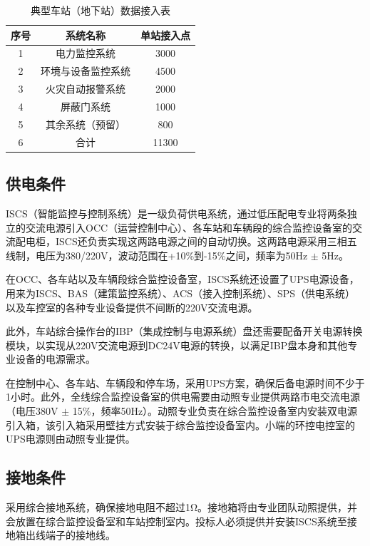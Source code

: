 \begin{table}[h]
	\centering
	\caption{典型车站（地下站）数据接入表}
	\label{tab:典型车站（地下站）数据接入表}
	
	\begin{tabular}{|c|c|c|}
		\hline
		序号 & 系统名称      & 单站接入点 \\ \hline
		1  & 电力监控系统    & 3000  \\ \hline
		2  & 环境与设备监控系统 & 4500  \\ \hline
		3  & 火灾自动报警系统  & 2000  \\ \hline
		4  & 屏蔽门系统     & 1000  \\ \hline
		5  & 其余系统（预留）  & 800   \\ \hline
		6  & 合计        & 11300 \\ \hline
	\end{tabular}%
\end{table}

\subsection{供电条件}
ISCS（智能监控与控制系统）是一级负荷供电系统，通过低压配电专业将两条独立的交流电源引入OCC（运营控制中心）、各车站和车辆段的综合监控设备室的交流配电柜，ISCS还负责实现这两路电源之间的自动切换。这两路电源采用三相五线制，电压为380/220V，波动范围在+10\%到-15\%之间，频率为50Hz $\pm$ 5Hz。

在OCC、各车站以及车辆段综合监控设备室，ISCS系统还设置了UPS电源设备，用来为ISCS、BAS（建策监控系统）、ACS（接入控制系统）、SPS（供电系统）以及车控室的各种专业设备提供不间断的220V交流电源。

此外，车站综合操作台的IBP（集成控制与电源系统）盘还需要配备开关电源转换模块，以实现从220V交流电源到DC24V电源的转换，以满足IBP盘本身和其他专业设备的电源需求。

在控制中心、各车站、车辆段和停车场，采用UPS方案，确保后备电源时间不少于1小时。此外，全线综合监控设备室的供电需要由动照专业提供两路市电交流电源（电压380V $\pm$ 15\%，频率50Hz）。动照专业负责在综合监控设备室内安装双电源引入箱，该引入箱采用壁挂方式安装于综合监控设备室内。小端的环控电控室的UPS电源则由动照专业提供。

\subsection{接地条件}
采用综合接地系统，确保接地电阻不超过1Ω。接地箱将由专业团队动照提供，并会放置在综合监控设备室和车站控制室内。投标人必须提供并安装ISCS系统至接地箱出线端子的接地线。
